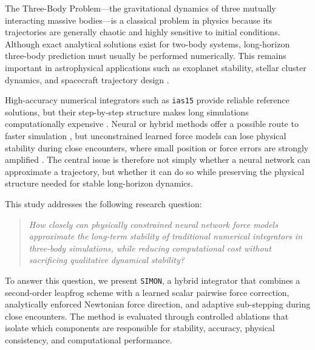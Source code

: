 \documentclass[12pt]{article}
\begin{document}
The Three-Body Problem---the gravitational dynamics of three mutually interacting massive bodies---is a classical problem in physics because its trajectories are generally chaotic and highly sensitive to initial conditions. Although exact analytical solutions exist for two-body systems, long-horizon three-body prediction must usually be performed numerically. This remains important in astrophysical applications such as exoplanet stability, stellar cluster dynamics, and spacecraft trajectory design \cite{gardner2006james}.

High-accuracy numerical integrators such as \texttt{ias15} provide reliable reference solutions, but their step-by-step structure makes long simulations computationally expensive \cite{Rein_2014}. Neural or hybrid methods offer a possible route to faster simulation \cite{ulibarrena2024hybrid}, but unconstrained learned force models can lose physical stability during close encounters, where small position or force errors are strongly amplified \cite{Dehnen2001}. The central issue is therefore not simply whether a neural network can approximate a trajectory, but whether it can do so while preserving the physical structure needed for stable long-horizon dynamics.

This study addresses the following research question:
\begin{quote}
\emph{How closely can physically constrained neural network force models approximate the long-term stability of traditional numerical integrators in three-body simulations, while reducing computational cost without sacrificing qualitative dynamical stability?}
\end{quote}

To answer this question, we present \texttt{SIMON}, a hybrid integrator that combines a second-order leapfrog scheme with a learned scalar pairwise force correction, analytically enforced Newtonian force direction, and adaptive sub-stepping during close encounters. The method is evaluated through controlled ablations that isolate which components are responsible for stability, accuracy, physical consistency, and computational performance.
\end{document}
